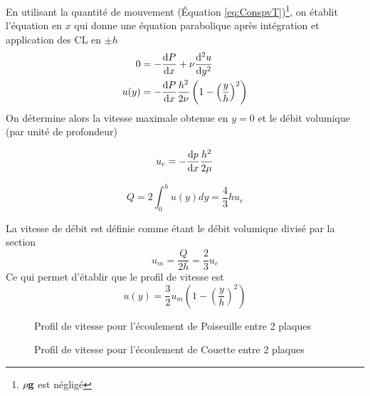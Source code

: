 \documentclass[a4paper,11pt]{report}
\begin{document}
        En utilisant la quantité de mouvement (Équation \ref{eq:ConspvT})\footnote{$\rho \vb{g}$ est négligé}, on établit l'équation en $x$ qui donne une équation parabolique après intégration et application des CL en $\pm h$
        \begin{equation}
          \begin{aligned}
            0 &= -\dv{P}{x} + \nu\dv[2]{u}{y} \\ \label{eq:Poiseuille}
            u(y) &= -\dv{P}{x}\frac{h^2}{2\nu} \left(1 - \left(\frac{y}{h}\right)^2\right)
          \end{aligned}
        \end{equation}
        On détermine alors la vitesse maximale obtenue en $y = 0$ et le débit volumique (par unité de profondeur)
        \begin{multicols}{2}
          \begin{equation}
            u_c = -\dv{p}{x} \frac{h^2}{2\mu}
          \end{equation}

          \begin{equation}
            Q = 2\int_0^h u(y)dy = \frac{4}{3} h u_c
          \end{equation}
        \end{multicols}

        La vitesse de débit est définie comme étant le débit volumique divisé par la section
        \begin{equation}
          u_m = \frac{Q}{2h} = \frac{2}{3} u_c
        \end{equation}
        Ce qui permet d'établir que le profil de vitesse est
        \begin{equation}
          u(y) = \frac{3}{2} u_m \left(1-\left(\frac{y}{h}\right)^2\right)
        \end{equation}

        \begin{figure}[h]
          \centering
          \begin{minipage}[c]{0.45\textwidth}
            
            \caption{Profil de vitesse pour l'écoulement de Poiseuille entre 2 plaques}
            \label{fig:PoiseuilleProfile}
          \end{minipage}
          \begin{minipage}[c]{0.45\textwidth}
            
            \caption{Profil de vitesse pour l'écoulement de Couette entre 2 plaques}
            \label{fig:CouetteProfile}
          \end{minipage}
        \end{figure}
\end{document}
